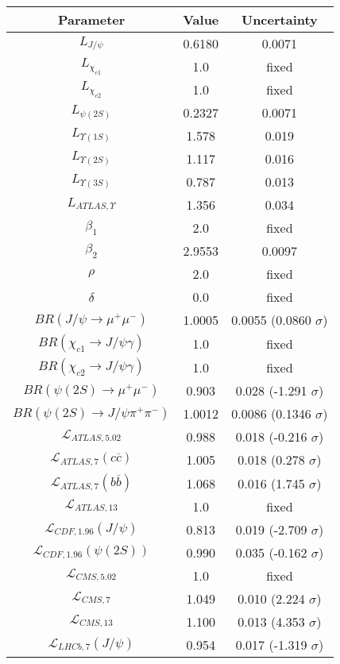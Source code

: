 \begin{table}[h!]
\centering
\begin{tabular}{c|c|c}
Parameter & Value & Uncertainty \\
\hline
$L_{J/\psi}$ & 0.6180 & 0.0071 \\
$L_{\chi_{c1}}$ & 1.0 & fixed \\
$L_{\chi_{c2}}$ & 1.0 & fixed \\
$L_{\psi(2S)}$ & 0.2327 & 0.0071 \\
$L_{\Upsilon(1S)}$ & 1.578 & 0.019 \\
$L_{\Upsilon(2S)}$ & 1.117 & 0.016 \\
$L_{\Upsilon(3S)}$ & 0.787 & 0.013 \\
$L_{ATLAS,\Upsilon}$ & 1.356 & 0.034 \\
$\beta_1$ & 2.0 & fixed \\
$\beta_2$ & 2.9553 & 0.0097 \\
$\rho$ & 2.0 & fixed \\
$\delta$ & 0.0 & fixed \\
$BR(J/\psi\rightarrow\mu^+\mu^-)$ & 1.0005 & 0.0055 (0.0860 $\sigma$) \\
$BR(\chi_{c1}\rightarrow J/\psi\gamma)$ & 1.0 & fixed \\
$BR(\chi_{c2}\rightarrow J/\psi\gamma)$ & 1.0 & fixed \\
$BR(\psi(2S)\rightarrow\mu^+\mu^-)$ & 0.903 & 0.028 (-1.291 $\sigma$) \\
$BR(\psi(2S)\rightarrow J/\psi\pi^+\pi^-)$ & 1.0012 & 0.0086 (0.1346 $\sigma$) \\
$\mathcal L_{ATLAS,5.02}$ & 0.988 & 0.018 (-0.216 $\sigma$) \\
$\mathcal L_{ATLAS,7}(c\overline c)$ & 1.005 & 0.018 (0.278 $\sigma$) \\
$\mathcal L_{ATLAS,7}(b\overline b)$ & 1.068 & 0.016 (1.745 $\sigma$) \\
$\mathcal L_{ATLAS,13}$ & 1.0 & fixed \\
$\mathcal L_{CDF,1.96}(J/\psi)$ & 0.813 & 0.019 (-2.709 $\sigma$) \\
$\mathcal L_{CDF,1.96}(\psi(2S))$ & 0.990 & 0.035 (-0.162 $\sigma$) \\
$\mathcal L_{CMS,5.02}$ & 1.0 & fixed \\
$\mathcal L_{CMS,7}$ & 1.049 & 0.010 (2.224 $\sigma$) \\
$\mathcal L_{CMS,13}$ & 1.100 & 0.013 (4.353 $\sigma$) \\
$\mathcal L_{LHCb,7}(J/\psi)$ & 0.954 & 0.017 (-1.319 $\sigma$) \\

\end{tabular}
\end{table}

